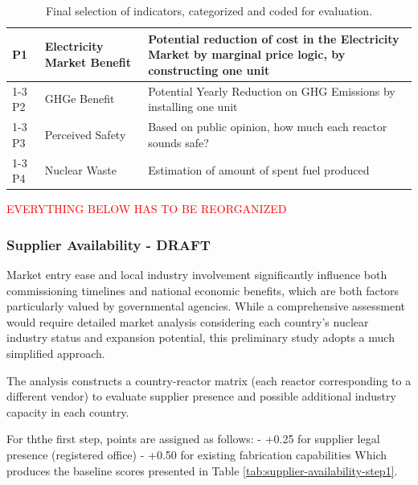 \begin{table}[!hb]
\begin{tabularx}{\textwidth}{llX}
        \midrule
        P1 & Electricity Market Benefit & Potential reduction of cost in the Electricity Market by marginal price logic, by constructing one unit \\
        \cmidrule(lr){1-3}
        P2 & GHGe Benefit & Potential Yearly Reduction on GHG Emissions by installing one unit \\
        \cmidrule(lr){1-3}
        P3 & Perceived Safety & Based on public opinion, how much each reactor sounds safe? \\
        \cmidrule(lr){1-3}
        P4 & Nuclear Waste & Estimation of amount of spent fuel produced \\
        \bottomrule
    \end{tabularx}
    \caption{Final selection of indicators, categorized and coded for evaluation.}
    \label{tab:final_indicators}
\end{table}



\newpage
\textcolor{red}{EVERYTHING BELOW HAS TO BE REORGANIZED}


\subsubsection{Supplier Availability - DRAFT}
Market entry ease and local industry involvement significantly influence both commissioning timelines and national economic benefits, which are both factors particularly valued by governmental agencies. While a comprehensive assessment would require detailed market analysis considering each country's nuclear industry status and expansion potential, this preliminary study adopts a much simplified approach.

The analysis constructs a country-reactor matrix (each reactor corresponding to a different vendor) to evaluate supplier presence and possible additional industry capacity in each country.

For ththe first step, points are assigned as follows:
- +0.25 for supplier legal presence (registered office)
- +0.50 for existing fabrication capabilities
Which produces the baseline scores presented in Table \ref{tab:supplier-availability-step1}.

